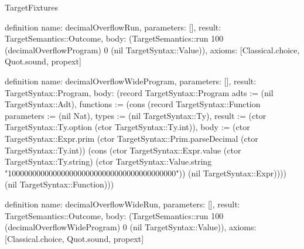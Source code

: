 \begin{lexlean}{TargetFixtures}
\begin{semanticmodule}
definition{
  name: decimalOverflowRun,
  parameters: [],
  result: TargetSemantics::Outcome,
  body: (TargetSemantics::run 100 (decimalOverflowProgram) 0 (nil TargetSyntax::Value)),
  axioms: [Classical.choice, Quot.sound, propext]
}

definition{
  name: decimalOverflowWideProgram,
  parameters: [],
  result: TargetSyntax::Program,
  body: (record TargetSyntax::Program {adts := (nil TargetSyntax::Adt), functions := (cons (record TargetSyntax::Function {parameters := (nil Nat), types := (nil TargetSyntax::Ty), result := (ctor TargetSyntax::Ty.option (ctor TargetSyntax::Ty.int)), body := (ctor TargetSyntax::Expr.prim (ctor TargetSyntax::Prim.parseDecimal (ctor TargetSyntax::Ty.int)) (cons (ctor TargetSyntax::Expr.value (ctor TargetSyntax::Ty.string) (ctor TargetSyntax::Value.string "10000000000000000000000000000000000000000")) (nil TargetSyntax::Expr)))}) (nil TargetSyntax::Function))})
}

definition{
  name: decimalOverflowWideRun,
  parameters: [],
  result: TargetSemantics::Outcome,
  body: (TargetSemantics::run 100 (decimalOverflowWideProgram) 0 (nil TargetSyntax::Value)),
  axioms: [Classical.choice, Quot.sound, propext]
}


\end{semanticmodule}
\end{lexlean}
